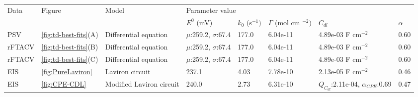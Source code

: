 \begin{table}[]
\begin{tabular}{|l|l|l|lllll|}
\hline
\multirow{2}{*}{Data} & \multirow{2}{*}{Figure} & \multirow{2}{*}{Model} & \multicolumn{5}{l|}{Parameter value}                                                                                                                             \\ \cline{4-8} 
                       &                         &                        & \multicolumn{1}{l|}{$E^0$ (mV)} & \multicolumn{1}{l|}{$k_0$ (s$^{-1})$} & \multicolumn{1}{l|}{$\Gamma$ (mol cm $^{-2})$} & \multicolumn{1}{l|}{$C_{dl}$ } & $\alpha$ \\ \hline
PSV &                     \ref{fig:td-best-fits}(A) &                       Differential equation &                      \multicolumn{1}{l|}{$\mu$:259.2, $\sigma$:67.4}&          \multicolumn{1}{l|}{177.0}&               \multicolumn{1}{l|}{6.04e-11}&                        \multicolumn{1}{l|}{4.89e-03 F cm$^{-2}$}&           0.60        \\ \hline
rFTACV &                     \ref{fig:td-best-fits}(B) &                       Differential equation &                      \multicolumn{1}{l|}{$\mu$:259.2, $\sigma$:67.4}&          \multicolumn{1}{l|}{177.0}&               \multicolumn{1}{l|}{6.04e-11}&                        \multicolumn{1}{l|}{4.89e-03 F cm$^{-2}$}&           0.60        \\ \hline
rFTACV &                     \ref{fig:td-best-fits}(C) &                       Differential equation &                      \multicolumn{1}{l|}{$\mu$:259.2, $\sigma$:67.4}&          \multicolumn{1}{l|}{177.0}&               \multicolumn{1}{l|}{6.04e-11}&                        \multicolumn{1}{l|}{4.89e-03 F cm$^{-2}$}&           0.60        \\ \hline
EIS &                     \ref{fig:PureLaviron} &                       Laviron circuit &                      \multicolumn{1}{l|}{237.1}&          \multicolumn{1}{l|}{4.03}&               \multicolumn{1}{l|}{7.78e-10}&                        \multicolumn{1}{l|}{2.13e-05 F cm$^{-2}$}&           0.46        \\ \hline
EIS &                     \ref{fig:CPE-CDL} &                       Modified Laviron circuit &                      \multicolumn{1}{l|}{240.0}&          \multicolumn{1}{l|}{2.73}&               \multicolumn{1}{l|}{6.31e-10}&                        \multicolumn{1}{l|}{$Q_{C_{dl}}$:2.11e-04, $\alpha_{CPE}$:0.69}&           0.47        \\ \hline

\end{tabular}
\end{table}
